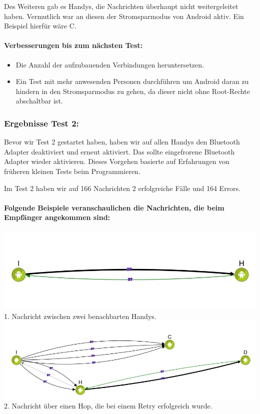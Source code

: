 Des Weiteren gab es Handys, die Nachrichten überhaupt nicht
weitergeleitet haben. Vermutlich war an diesen der Stromsparmodus von
Android aktiv. Ein Beispiel hierfür wäre C.

\paragraph*{Verbesserungen bis zum nächsten Test:}

\begin{itemize}
\tightlist
\item
  Die Anzahl der aufzubauenden Verbindungen heruntersetzen.
\item
  Ein Test mit mehr anwesenden Personen durchführen um Android daran zu
  hindern in den Stromsparmodus zu gehen, da dieser nicht ohne
  Root-Rechte abschaltbar ist.
\end{itemize}

\subsubsection{Ergebnisse Test 2:}\label{ergebnisse-test-2}

Bevor wir Test 2 gestartet haben, haben wir auf allen Handys den
Bluetooth Adapter deaktiviert und erneut aktiviert. Das sollte
eingefrorene Bluetooth Adapter wieder aktivieren. Dieses Vorgehen
basierte auf Erfahrungen von früheren kleinen Tests beim Programmieren.

Im Test 2 haben wir auf 166 Nachrichten 2 erfolgreiche Fälle und 164
Errors.

\paragraph*{Folgende Beispiele veranschaulichen die Nachrichten, die beim
Empfänger angekommen sind:}
\includegraphics[width=1.0\textwidth]{belege/grosstests/Bilder/Test2Erfolg1.jpg}\\
 1. Nachricht
zwischen zwei benachbarten Handys.\\
\includegraphics[width=1.0\textwidth]{belege/grosstests/Bilder/Test2Erfolg2.jpg}\\ 2. Nachricht
über einen Hop, die bei einem Retry erfolgreich wurde.\\

